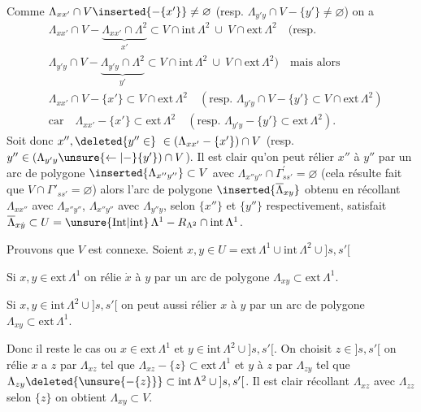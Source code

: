 Comme $\Lambda_{xx'}\cap V\inserted{-\{x'\}}\ne\varnothing$  (resp. $\Lambda_{y'y}\cap V-\{y'\}\ne\varnothing$) on a
\[
\begin{aligned}
&\Lambda_{xx'}\cap V-\underbrace{\Lambda_{xx'}\cap\Lambda^{2}}_{x'}\subset V\cap\mathrm{int}\,\Lambda^{2}\ \cup\ V\cap\mathrm{ext}\,\Lambda^{2}\quad(\text{resp.}\\
&\Lambda_{y'y}\cap V-\underbrace{\Lambda_{y'y}\cap\Lambda^{2}}_{y'}\subset V\cap\mathrm{int}\,\Lambda^{2}\ \cup\ V\cap\mathrm{ext}\,\Lambda^{2})\quad\text{mais alors}\\
&\Lambda_{xx'}\cap V-\{x'\}\subset V\cap\mathrm{ext}\,\Lambda^{2}\quad(\text{resp. }\Lambda_{y'y}\cap V-\{y'\}\subset V\cap\mathrm{ext}\,\Lambda^{2})\\
&\text{car}\quad \Lambda_{xx'}-\{x'\}\subset\mathrm{ext}\,\Lambda^{2}\quad(\text{resp. }\Lambda_{y'y}-\{y'\}\subset\mathrm{ext}\,\Lambda^{2}).
\end{aligned}
\]
Soit donc $x'',\deleted{y''\in}\ \in(\Lambda_{xx'}-\{x'\})\cap V$ (resp. $y''\in(\Lambda_{y'y}\unsure{\leftarrow|-}\{y'\})\cap V$).
Il est clair qu'on peut rélier $x''$ à $y''$ par un arc de polygone $\inserted{\Lambda_{x''y''}}\subset V$ avec $\Lambda_{x''y''}\cap\Gamma^{\prime}_{ss'}=\varnothing$ (cela résulte  fait que $V\cap\Gamma'_{ss'}=\varnothing$) alors l'arc de polygone $\inserted{\overline{\Lambda}_{xy}}$ obtenu
\reversemarginpar\margin{$\vert$}\normalmarginpar\margin{$\vert$}%
en récollant $\Lambda_{xx''}$ avec $\Lambda_{x''y''}$, $\Lambda_{x''y''}$ avec $\Lambda_{y''y}$, selon $\{x''\}$ et $\{y''\}$ respectivement, satisfait $\overline{\Lambda}_{x\dot y}\subset U=\unsure{\mathrm{Int}|\mathrm{int}}\,\Lambda^{1}-R_{\Lambda^{2}}\cap\mathrm{int}\,\Lambda^{1}$.

Prouvons que $V$ est connexe. Soient $x,y\in U=\mathrm{ext}\,\Lambda^{1}\cup\mathrm{int}\,\Lambda^{2}\cup{]s,s'[}$

Si $x,y\in\mathrm{ext}\,\Lambda^{1}$ on rélie $\dot{x}$ à $y$ par un arc de polygone $\Lambda_{xy}\subset\mathrm{ext}\,\Lambda^{1}$.

Si $x,y\in\mathrm{int}\,\Lambda^{2}\cup{]s,s'[}$ on peut aussi rélier $x$ à $y$ par un arc de polygone $\Lambda_{xy}\subset\mathrm{ext}\,\Lambda^{1}$.

Donc il reste le cas ou $x\in\mathrm{ext}\,\Lambda^{1}$ et $y\in\mathrm{int}\,\Lambda^{2}\cup{]s,s'[}$. On choisit $z\in{]s,s'[}$ on rélie $x$ a $z$ par $\Lambda_{xz}$ tel que $\Lambda_{xz}-\{z\}\subset\mathrm{ext}\,\Lambda^{1}$ et $y$ à $z$ par $\Lambda_{zy}$ tel que $\Lambda_{zy}\deleted{\unsure{-\{z\}}}\subset\mathrm{int}\,\Lambda^{2}\cup{]s,s'[}$. Il est clair  récollant $\Lambda_{xz}$ avec $\Lambda_{zz}$ selon $\{z\}$ on obtient $\Lambda_{xy}\subset V$.

